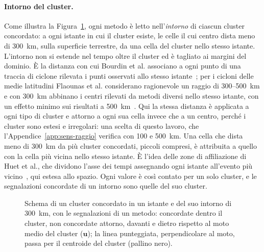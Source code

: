 \paragraph{Intorno del cluster.} Come illustra la Figura~\ref{fig:exp-intorno}, ogni metodo è letto nell'\emph{intorno} di ciascun cluster concordato: a ogni istante in cui il cluster esiste, le celle il cui centro dista meno di 300~km, sulla superficie terrestre, da una cella del cluster nello stesso istante. L'intorno non si estende nel tempo oltre il cluster ed è tagliato ai margini del dominio. È la distanza con cui Bourdin et al. associano a ogni punto di una traccia di ciclone rilevata i punti osservati allo stesso istante~\cite{bourdin2022tc}; per i cicloni delle medie latitudini Flaounas et al. considerano ragionevole un raggio di 300--500~km e con 300~km abbinano i centri rilevati da metodi diversi nello stesso istante, con un effetto minimo sui risultati a 500~km~\cite{flaounas2023composite}. Qui la stessa distanza è applicata a ogni tipo di cluster e attorno a ogni sua cella invece che a un centro, perché i cluster sono estesi e irregolari: una scelta di questo lavoro, che l'Appendice~\ref{app:sens-raggio} verifica con 100 e 500~km. Una cella che dista meno di 300~km da più cluster concordati, piccoli compresi, è attribuita a quello con la cella più vicina nello stesso istante. È l'idea delle zone di affiliazione di Huet et al., che dividono l'asse dei tempi assegnando ogni istante all'evento più vicino~\cite{huet2022affiliation}, qui estesa allo spazio. Ogni valore è così contato per un solo cluster, e le segnalazioni concordate di un intorno sono quelle del suo cluster.

\begin{figure}[htbp]
    \centering
    
    \caption{Schema di un cluster concordato in un istante e del suo intorno di 300~km, con le segnalazioni di un metodo: concordate dentro il cluster, non concordate attorno, davanti e dietro rispetto al moto medio del cluster ($\mathbf{u}$); la linea punteggiata, perpendicolare al moto, passa per il centroide del cluster (pallino nero).}
    \label{fig:exp-intorno}
\end{figure}

